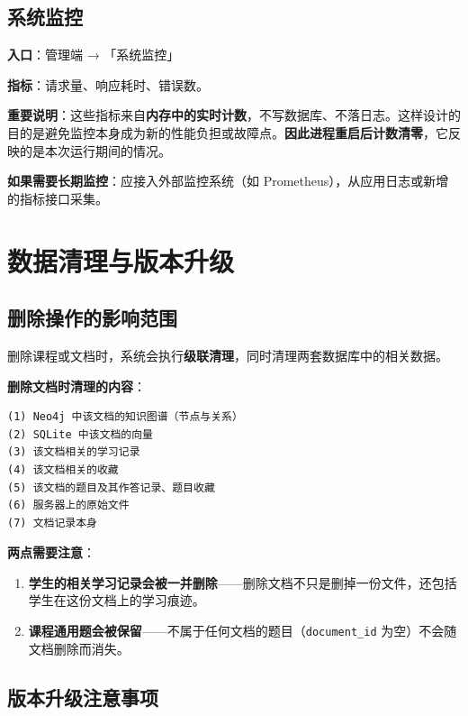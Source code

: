 \documentclass[UTF8,a4paper,11pt]{ctexrep}
\begin{document}
\subsection{系统监控}

\textbf{入口}：管理端 → 「系统监控」

\textbf{指标}：请求量、响应耗时、错误数。

\textbf{重要说明}：这些指标来自\textbf{内存中的实时计数}，不写数据库、不落日志。这样设计的目的是避免监控本身成为新的性能负担或故障点。\textbf{因此进程重启后计数清零}，它反映的是本次运行期间的情况。

\textbf{如果需要长期监控}：应接入外部监控系统（如 Prometheus），从应用日志或新增的指标接口采集。


\section{数据清理与版本升级}


\subsection{删除操作的影响范围}

删除课程或文档时，系统会执行\textbf{级联清理}，同时清理两套数据库中的相关数据。

\textbf{删除文档时清理的内容}：

\begin{Verbatim}[breaklines=true,breakanywhere=true,fontsize=\small,frame=single,framesep=4pt,rulecolor=\color{codeframe}]
(1) Neo4j 中该文档的知识图谱（节点与关系）
(2) SQLite 中该文档的向量
(3) 该文档相关的学习记录
(4) 该文档相关的收藏
(5) 该文档的题目及其作答记录、题目收藏
(6) 服务器上的原始文件
(7) 文档记录本身
\end{Verbatim}

\textbf{两点需要注意}：

\begin{enumerate}
\item \textbf{学生的相关学习记录会被一并删除}——删除文档不只是删掉一份文件，还包括学生在这份文档上的学习痕迹。
\item \textbf{课程通用题会被保留}——不属于任何文档的题目（\texttt{document\_id} 为空）不会随文档删除而消失。
\end{enumerate}

\subsection{版本升级注意事项}
\end{document}
